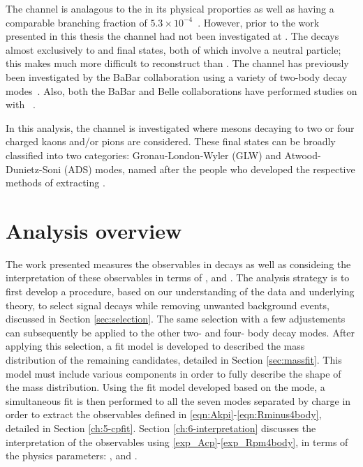 The \decay{\Bm}{\D\Kstarm} channel is analagous to the \decay{\Bm}{\D\Km} in its physical proporties as well as having a comparable branching fraction of $5.3 \times 10^{-4}$~\cite{PDG2016}. However, prior to the work presented in this thesis the \decay{\Bm}{\D\Kstarm} channel had not been investigated at \lhcb. The \Kstarm decays almost exclusively to \KS\pim and \Km\piz final states, both of which involve a neutral particle; this makes \decay{\Bm}{\D\Kstarm} much more difficult to reconstruct than \decay{\Bm}{\D\Km}. The \decay{\Bm}{\D\Kstarm} channel has previously been investigated by the BaBar collaboration using a variety of two-body \D decay modes~\cite{BaBarDKstar}. Also, both the BaBar and Belle collaborations have performed studies on \decay{\Bm}{\D\Kstarm} with \decay{\D}{\KS\pip\pim}~\cite{BaBarGGSZ,BelleGGSZ}.

In this analysis, the \decay{\Bm}{\D\Kstarm} channel is investigated where \D mesons decaying to two or four charged kaons and/or pions are considered. These final states can be broadly classified into two categories: Gronau-London-Wyler (GLW) and Atwood-Dunietz-Soni (ADS) modes, named after the people who developed the respective methods of extracting \Pgamma.

\section{Analysis overview}

The work presented measures the \CP observables in \decay{\Bm}{\D\Kstarm} decays as well as consideing the interpretation of these observables in terms of \rb, \deltab and \Pgamma. The analysis strategy is to first develop a procedure, based on our understanding of the data and underlying theory, to select \decay{\Bm}{\D(\Km\pip)\Kstarm} signal decays while removing unwanted background events, discussed in Section \ref{sec:selection}. The same selection with a few adjustements can subsequently be applied to the other two- and four- body \D decay modes. After applying this selection, a fit model is developed to described the \B mass distribution of the remaining \decay{\Bm}{\D(\Km\pip)\Kstarm} candidates, detailed in Section \ref{sec:massfit}. This model must include various components in order to fully describe the shape of the \B mass distribution. Using the fit model developed based on the \decay{\Bm}{\D(\Km\pip)\Kstarm} mode, a simultaneous fit is then performed to all the seven \D modes separated by \B charge in order to extract the \CP observables defined in \eqn\ref{eqn:Akpi}-\ref{eqn:Rminus4body}, detailed in Section \ref{ch:5-cpfit}. Section \ref{ch:6-interpretation} discusses the interpretation of the \CP observables using \eqn\ref{exp_Acp}-\ref{exp_Rpm4body}, in terms of the physics parameters: \rb, \deltab and \Pgamma.